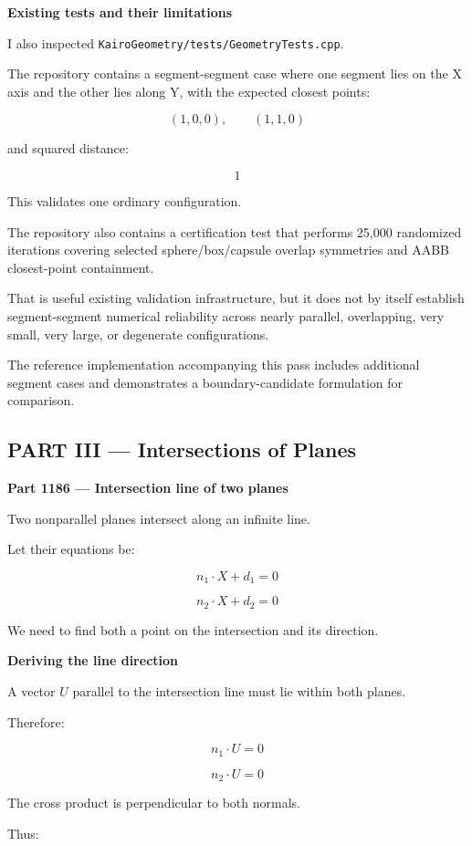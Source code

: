 \textbf{Existing tests and their limitations}

I also inspected \texttt{KairoGeometry/tests/GeometryTests.cpp}.

The repository contains a segment-segment case where one segment lies on the X axis and the other lies along Y, with the expected closest points:

\[
(1,0,0),\qquad(1,1,0)
\]

and squared distance:

\[
1
\]

This validates one ordinary configuration.

The repository also contains a certification test that performs 25,000 randomized iterations covering selected sphere/box/capsule overlap symmetries and AABB closest-point containment.

That is useful existing validation infrastructure, but it does not by itself establish segment-segment numerical reliability across nearly parallel, overlapping, very small, very large, or degenerate configurations.

The reference implementation accompanying this pass includes additional segment cases and demonstrates a boundary-candidate formulation for comparison.

\subsection{PART III --- Intersections of Planes}\label{04-visual-computing-ii-ch022-part-iii-intersections-of-planes}

\textbf{Part 1186 --- Intersection line of two planes}

Two nonparallel planes intersect along an infinite line.

Let their equations be:

\[
n_1\cdot X+d_1=0
\]

\[
n_2\cdot X+d_2=0
\]

We need to find both a point on the intersection and its direction.

\textbf{Deriving the line direction}

A vector \(U\) parallel to the intersection line must lie within both planes.

Therefore:

\[
n_1\cdot U=0
\]

\[
n_2\cdot U=0
\]

The cross product is perpendicular to both normals.

Thus:

